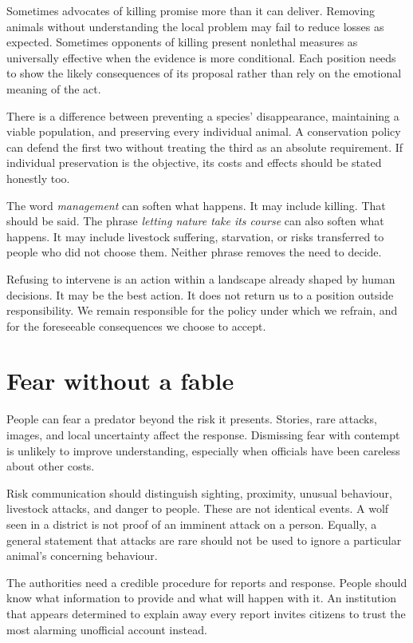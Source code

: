 \documentclass[12pt,a4paper]{book}
\begin{document}
Sometimes advocates of killing promise more than it can deliver. Removing animals without understanding the local problem may fail to reduce losses as expected. Sometimes opponents of killing present nonlethal measures as universally effective when the evidence is more conditional. Each position needs to show the likely consequences of its proposal rather than rely on the emotional meaning of the act.

There is a difference between preventing a species' disappearance, maintaining a viable population, and preserving every individual animal. A conservation policy can defend the first two without treating the third as an absolute requirement. If individual preservation is the objective, its costs and effects should be stated honestly too.

The word \emph{management} can soften what happens. It may include killing. That should be said. The phrase \emph{letting nature take its course} can also soften what happens. It may include livestock suffering, starvation, or risks transferred to people who did not choose them. Neither phrase removes the need to decide.

Refusing to intervene is an action within a landscape already shaped by human decisions. It may be the best action. It does not return us to a position outside responsibility. We remain responsible for the policy under which we refrain, and for the foreseeable consequences we choose to accept.

\section*{Fear without a fable}

People can fear a predator beyond the risk it presents. Stories, rare attacks, images, and local uncertainty affect the response. Dismissing fear with contempt is unlikely to improve understanding, especially when officials have been careless about other costs.

Risk communication should distinguish sighting, proximity, unusual behaviour, livestock attacks, and danger to people. These are not identical events. A wolf seen in a district is not proof of an imminent attack on a person. Equally, a general statement that attacks are rare should not be used to ignore a particular animal's concerning behaviour.

The authorities need a credible procedure for reports and response. People should know what information to provide and what will happen with it. An institution that appears determined to explain away every report invites citizens to trust the most alarming unofficial account instead.
\end{document}
